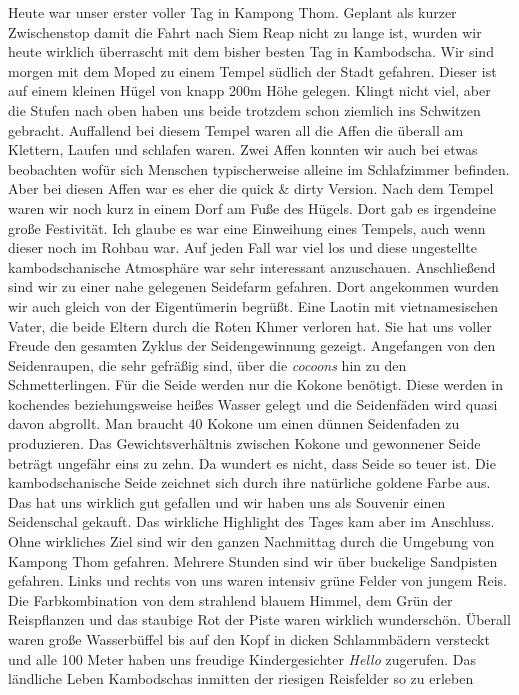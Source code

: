 \documentclass[11pt]{book}
\begin{document}
Heute war unser erster voller Tag in Kampong Thom. Geplant als kurzer Zwischenstop damit die Fahrt nach Siem Reap nicht zu lange ist, 
wurden wir heute wirklich überrascht mit dem bisher besten Tag in Kambodscha. Wir sind morgen mit dem Moped zu einem Tempel südlich 
der Stadt gefahren. Dieser ist auf einem kleinen Hügel von knapp 200m Höhe gelegen. Klingt nicht viel, aber die Stufen nach oben 
haben uns beide trotzdem schon ziemlich ins Schwitzen gebracht. Auffallend bei diesem Tempel waren all die Affen die überall am Klettern, 
Laufen und schlafen waren. Zwei Affen konnten wir auch bei etwas beobachten wofür sich Menschen typischerweise alleine im Schlafzimmer 
befinden. Aber bei diesen Affen war es eher die quick \& dirty Version. Nach dem Tempel waren wir noch kurz in einem Dorf am Fuße 
des Hügels. Dort gab es irgendeine große Festivität. Ich glaube es war eine Einweihung eines Tempels, auch wenn dieser noch im Rohbau 
war. Auf jeden Fall war viel los und diese ungestellte kambodschanische Atmosphäre war sehr interessant anzuschauen. Anschließend sind 
wir zu einer nahe gelegenen Seidefarm gefahren. Dort angekommen wurden wir auch gleich von der Eigentümerin begrüßt. Eine Laotin mit 
vietnamesischen Vater, die beide Eltern durch die Roten Khmer verloren hat. Sie hat uns voller Freude den gesamten Zyklus der Seidengewinnung 
gezeigt. Angefangen von den Seidenraupen, die sehr gefräßig sind, über die \emph{cocoons} hin zu den Schmetterlingen. Für die Seide 
werden nur die Kokone benötigt. Diese werden in kochendes beziehungsweise heißes Wasser gelegt und die Seidenfäden wird quasi davon 
abgrollt. Man braucht 40 Kokone um einen dünnen Seidenfaden zu produzieren. Das Gewichtsverhältnis zwischen Kokone und gewonnener Seide 
beträgt ungefähr eins zu zehn. Da wundert es nicht, dass Seide so teuer ist. Die kambodschanische Seide zeichnet sich durch ihre 
natürliche goldene Farbe aus. Das hat uns wirklich gut gefallen und wir haben uns als Souvenir einen Seidenschal gekauft. Das wirkliche 
Highlight des Tages kam aber im Anschluss. Ohne wirkliches Ziel sind wir den ganzen Nachmittag durch die Umgebung von Kampong Thom 
gefahren. Mehrere Stunden sind wir über buckelige Sandpisten gefahren. Links und rechts von uns waren intensiv grüne Felder von 
jungem Reis. Die Farbkombination von dem strahlend blauem Himmel, dem Grün der Reispflanzen und das staubige Rot der Piste waren wirklich 
wunderschön. Überall waren große Wasserbüffel bis auf den Kopf in dicken Schlammbädern versteckt und alle 100 Meter haben uns 
freudige Kindergesichter \emph{Hello} zugerufen. Das ländliche Leben Kambodschas inmitten der riesigen Reisfelder so zu erleben 
\end{document}
